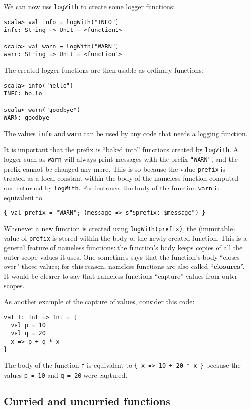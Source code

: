 We can now use \lstinline!logWith! to create some logger functions:
\begin{lstlisting}
scala> val info = logWith("INFO")
info: String => Unit = <function1>

scala> val warn = logWith("WARN")
warn: String => Unit = <function1>
\end{lstlisting}
The created logger functions are then usable as ordinary functions:
\begin{lstlisting}
scala> info("hello")
INFO: hello

scala> warn("goodbye")
WARN: goodbye
\end{lstlisting}
The values \lstinline!info! and \lstinline!warn! can be used by
any code that needs a logging function.

It is important that the prefix is ``baked into'' functions created
by \lstinline!logWith!. A logger such as \lstinline!warn! will always
print messages with the prefix \lstinline!"WARN"!, and the prefix
cannot be changed any more. This is so because the value \lstinline!prefix!
is treated as a local constant within the body of the nameless function
computed and returned by \lstinline!logWith!. For instance, the body
of the function \lstinline!warn! is equivalent to
\begin{lstlisting}
{ val prefix = "WARN"; (message => s"$prefix: $message") }
\end{lstlisting}
Whenever a new function is created using \lstinline!logWith(prefix)!,
the (immutable) value of \lstinline!prefix! is stored within the
body of the newly created function. This is a general feature of nameless
functions: the function's body keeps copies of all the outer-scope
values it uses. One sometimes says that the function's body ``closes
over'' those values; for this reason, nameless functions are also
called ``\textbf{closures}''. It would be clearer
to say that nameless functions ``capture'' values from outer scopes.

As another example of the capture of values, consider this code:
\begin{lstlisting}
val f: Int => Int = {
  val p = 10
  val q = 20
  x => p + q * x
}
\end{lstlisting}
The body of the function \lstinline!f! is equivalent to \lstinline!{ x => 10 + 20 * x }!
because the values \lstinline!p = 10! and \lstinline!q = 20! were
captured.

\subsection{Curried and uncurried functions}

